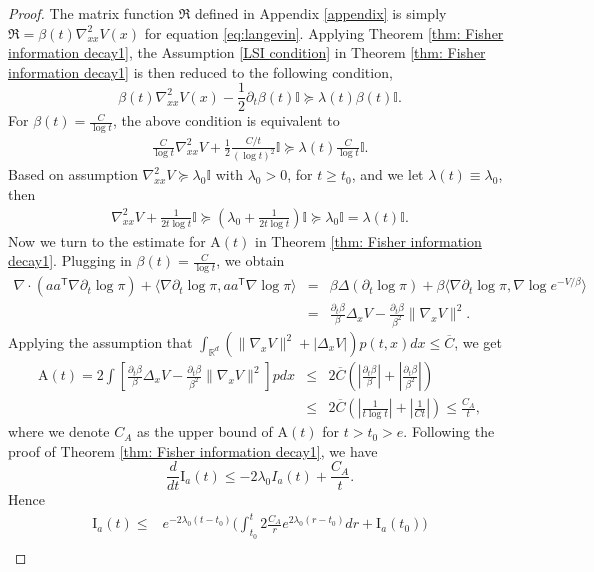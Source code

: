 \documentclass[11pt,reqno]{amsart}
\newcommand{\la}{\langle}
\newcommand{\ra}{\rangle}
\newcommand{\ts}{\mathsf{T}}
\newcommand{\bea}{\begin{eqnarray}}
\newcommand{\eea}{\end{eqnarray}}
\newcommand{\beaa}{\begin{eqnarray*}}
\newcommand{\eeaa}{\end{eqnarray*}}
\def\hR{\mathbb{R}}
\def\pa{\partial}
\begin{document}
\begin{proof}
The matrix function $\mathfrak R$ defined in Appendix \eqref{appendix} is simply $\mathfrak R=\beta(t)\nabla^2_{xx}V(x)$ for equation \eqref{eq:langevin}. Applying Theorem \ref{thm: Fisher information decay1}, the Assumption \eqref{LSI condition} in Theorem \ref{thm: Fisher information decay1} is then reduced to the following condition,  
\begin{equation}\label{LSI condition a}
   {\beta(t)} \nabla^2_{xx}V(x)-\frac{1}{2}\pa_t \beta(t)\mathbb I
    \succeq \lambda(t) \beta(t) \mathbb I.
\end{equation}
For $\beta(t)=\frac{C}{\log t}$, the above condition is equivalent to
\beaa 
\frac{C}{\log t}\nabla^2_{xx}V+\frac{1}{2}\frac{C/t}{(\log t)^2}\mathbb I \succeq \lambda(t) \frac{C}{\log t}\mathbb I.
\eeaa 
Based on assumption $\nabla^2_{xx}V \succeq \lambda_0\mathbb I$ with $\lambda_0>0$, for $t\ge t_0$, and we let $\lambda(t)\equiv \lambda_0$, then
\bea \label{lambda upper bound}
\nabla^2_{xx}V+\frac{1}{2t\log t}\mathbb I\succeq  (\lambda_0+\frac{1}{2t\log t})\mathbb I\succeq \lambda_0\mathbb I=\lambda(t)\mathbb I.
\eea 
Now we turn to the estimate for $\mathrm A(t)$ in Theorem \ref{thm: Fisher information decay1}. Plugging in $\beta(t)=\frac{C}{\log t}$, we obtain 
\beaa
\nabla\cdot(aa^{\ts}\nabla \pa_t\log\pi )+\la \nabla \pa_t\log\pi, aa^{\ts}\nabla\log\pi\ra 
&=&\beta\Delta (\pa_t\log\pi)+\beta \la \nabla \pa_t\log\pi,\nabla\log e^{-V/\beta}\ra \\
&=&\frac{\pa_t\beta}{\beta} \Delta_{x}V-\frac{\pa_t\beta}{\beta^2}\| \nabla_{x}V\|^2.
\eeaa 
Applying the assumption that $\int_{\hR^d} (\|\nabla_xV\|^2+|\Delta_xV|){p} (t,x)dx\le \overline{C}$, we get 
\beaa  
\mathrm A(t)={2\int [\frac{\pa_t\beta}{\beta}\Delta_x V-\frac{\pa_t\beta}{\beta^2}\|\nabla_{x}V\|^2]{p}  dx}&\le& 2 \overline{C}( |\frac{\pa_t\beta}{\beta}| +|\frac{\pa_t\beta}{\beta^2}|)\\
&\le &2 \overline{C}( |\frac{1}{t\log t}| +|\frac{1}{Ct}|) \le  \frac{C_A}{t}, 
\eeaa 
where we denote $C_A$ as the upper bound of $\mathrm A(t)$ for $t>t_0>e$. Following the proof of Theorem \ref{thm: Fisher information decay1}, we have  
\begin{equation*}
     \frac{d}{dt}\mathrm I_a(t)\le -2\lambda_0 I_a(t)+\frac{C_A}{t}.
\end{equation*}
Hence  
\begin{equation*}
\begin{split}
    \mathrm I_a(t)\leq &e^{-2\lambda_0(t-t_0)}\Big(\int_{t_0}^t 2\frac{C_A}{r}e^{2\lambda_0(r-t_0)} dr+\mathrm I_a(t_0)\Big)\\

\end{split}
\end{equation*}
\end{proof}
\end{document}
